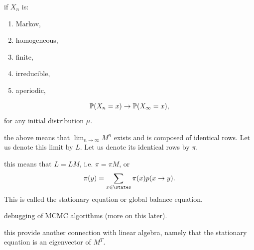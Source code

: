 \documentclass{article}
\begin{document}
 if $X_n$ is:
\begin{enumerate}
  \item Markov,
  \item homogeneous,
  \item finite, 
  \item irreducible,
  \item aperiodic,
\end{enumerate}
\[ \P(X_n = x) \to \P(X_\infty = x), \]for any initial distribution $\mu$.

 the above means that $\lim_{n\to \infty} M^n$ exists and is composed of identical rows. Let us denote this limit by $L$. Let us denote its identical rows by $\pi$. 

 this means that $L = LM$, i.e. $\pi = \pi M$, or \[ \pi(y) = \sum_{x \in \states} \pi(x) p(x \to y). \]This is called the stationary equation or global balance equation.

 debugging of MCMC algorithms (more on this later).

 this provide another connection with linear algebra, namely that the stationary equation is an eigenvector of $M^T$.
\end{document}
